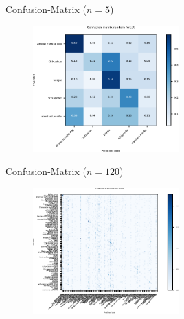   \begin{frame}{Confusion-Matrix ($n = 5$)}
    \begin{figure}
      \centering
      \includegraphics[width=0.5\textwidth]{logos/RF/confusion_matrix_rf.pdf}
      \label{fig:cm_rf}
    \end{figure}
  \end{frame}

  \begin{frame}{Confusion-Matrix ($n = 120$)}
    \begin{figure}
      \centering
      \includegraphics[width=0.5\textwidth]{logos/RF/confusion_matrix_big.pdf}
      \label{fig:cm_rf_big}
    \end{figure}
  \end{frame}



